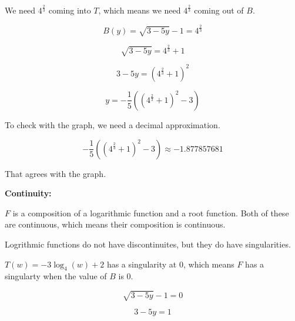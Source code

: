 \documentclass{ximera}
\begin{document}
We need $4^{\tfrac{2}{3}}$ coming into $T$, which means we need $4^{\tfrac{2}{3}}$ coming out of $B$.





\[
B(y) = \sqrt{3 - 5y} - 1 = 4^{\tfrac{2}{3}}
\]



\[
\sqrt{3 - 5y} = 4^{\tfrac{2}{3}} + 1
\]



\[
3 - 5y = \left( 4^{\tfrac{2}{3}} + 1 \right)^2
\]



\[
y = -\frac{1}{5} \left( \left( 4^{\tfrac{2}{3}} + 1 \right)^2 - 3 \right)
\]


To check with the graph, we need a decimal approximation.






\[
-\frac{1}{5} \left( \left( 4^{\tfrac{2}{3}} + 1 \right)^2 - 3 \right) \approx -1.877857681
\]


That agrees with the graph.



































\textbf{\textcolor{blue!55!black}{Continuity:}} 


$F$ is a composition of a logarithmic function and a root function.  Both of these are continuous, which means their composition is continuous. 

Logrithmic functions do not have discontinuites, but they do have singularities.  


$T(w) = -3 \log_4(w) + 2$ has a singularity at $0$, which means $F$ has a singularty when the value of $B$ is $0$.



\[
\sqrt{3 - 5y} - 1 = 0
\]



\[
3 - 5y = 1
\]
\end{document}
